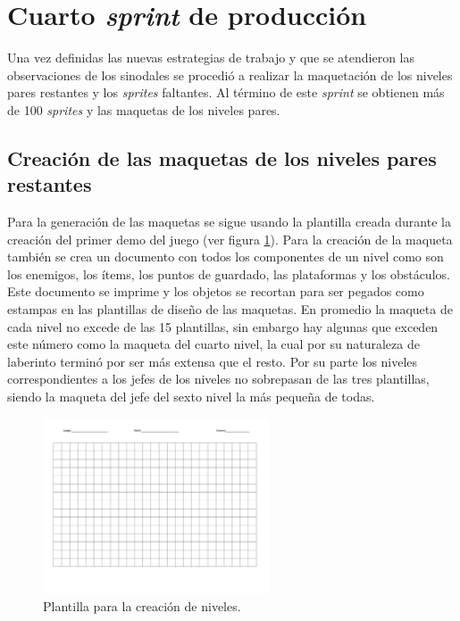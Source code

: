 \section{Cuarto \textit{sprint} de producción}
Una vez definidas las nuevas estrategias de trabajo y que se atendieron
las observaciones de los sinodales se procedió a realizar la maquetación de los
niveles pares restantes y los \textit{sprites} faltantes. Al término de este
\textit{sprint} se obtienen más de 100 \textit{sprites} y las maquetas de los
niveles pares.

\subsection{Creación de las maquetas de los niveles pares restantes}
Para la generación de las maquetas se sigue usando la plantilla creada durante
la creación del primer demo del juego (ver figura \ref{fig:MaquetaPlantilla}).
Para la creación de la maqueta también se crea un documento con todos los
componentes de un nivel como son los enemigos, los ítems, los puntos de guardado,
las plataformas y los obstáculos. Este documento se imprime y los objetos se
recortan para ser pegados como estampas en las plantillas de diseño de las
maquetas. En promedio la maqueta de cada nivel no excede de las 15 plantillas,
sin embargo hay algunas que exceden este número como la maqueta del cuarto nivel,
la cual por su naturaleza de laberinto terminó por ser más extensa que el
resto. Por su parte los niveles correspondientes a los jefes de los niveles no
sobrepasan de las tres plantillas, siendo la maqueta del jefe del sexto nivel
la más pequeña de todas.

\begin{figure}[h]
    \centering
    \includegraphics[width=0.6\textwidth]{03TrabajoRealizado/imagenes/maqueta-1.png}
     \caption{Plantilla para la creación de niveles.}
    \label{fig:MaquetaPlantilla}        
\end{figure}

